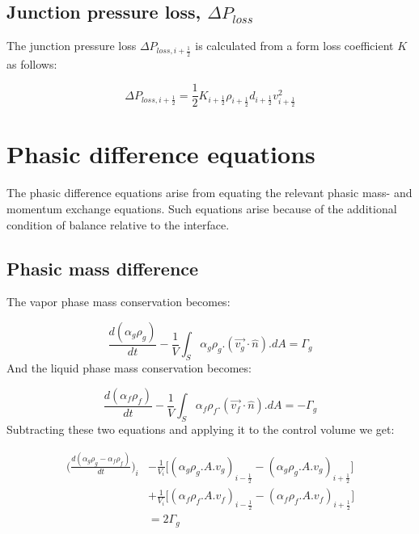 \documentclass[11pt,letterpaper,titlepage]{article}
\newcommand{\half}{\frac{1}{2}}
\begin{document}
\vspace{1cm}
\subsection{Junction pressure loss, $\Delta P_{loss}$}
The junction pressure loss $\Delta P_{loss,i+\half}$ is calculated from a form loss coefficient $K$ as follows:

\begin{equation*}
\Delta P_{loss,i+\half} = \half K_{i+\half} \rho_{i+\half} d_{i+\half} v_{i+\half}^2
\end{equation*}









\newpage
{}
\section{Phasic difference equations}
The phasic difference equations arise from equating the relevant phasic mass- and momentum exchange equations. Such equations arise because of the additional condition of balance relative to the interface.

\subsection{Phasic mass difference}
The vapor phase mass conservation becomes:

\begin{equation*}
\frac{d(\alpha_g \rho_g)}{dt}-\frac{1}{V}\int_S \alpha_g\rho_g.(\vec{v_g}\cdot \hat{n}).dA=\Gamma_g
\end{equation*}
\newline
\noindent
And the liquid phase mass conservation becomes:

\begin{equation*}
\frac{d(\alpha_f\rho_f)}{dt}-\frac{1}{V}\int_S \alpha_f\rho_f.(\vec{v_f}\cdot \hat{n}).dA=-\Gamma_g
\end{equation*}
\newline
\noindent Subtracting these two equations and applying it to the control volume we get:

\begin{equation}
\begin{aligned}
\biggr ( \frac{d(\alpha_g \rho_g-\alpha_f\rho_f)}{dt} \biggr )_i
&-\frac{1}{V_i}\biggr[ (\alpha_g\rho_g.A.v_g)_{i-\half}-(\alpha_g\rho_g.A.v_g)_{i+\half} \biggr]\\
&+ \frac{1}{V_i}\biggr[ (\alpha_f\rho_f.A.v_f)_{i-\half}-(\alpha_f\rho_f.A.v_f)_{i+\half} \biggr]\\
&=2\Gamma_g
\end{aligned}
\end{equation}
\end{document}
